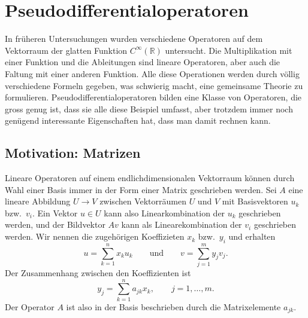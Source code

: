 %
%
%
\section{Pseudodifferentialoperatoren
\label{buch:opertoren:section:pseudodifferentialoperatoren}}
In früheren Untersuchungen wurden verschiedene Operatoren
auf dem Vektorraum der glatten Funktion $C^\infty(\mathbb{R})$ 
untersucht.
Die Multiplikation mit einer Funktion und die Ableitungen sind 
lineare Operatoren, aber auch die Faltung mit einer anderen Funktion.
Alle diese Operationen werden durch völlig verschiedene Formeln
gegeben, was schwierig macht, eine gemeinsame Theorie zu formulieren.
Pseudodifferentialoperatoren bilden eine Klasse von Operatoren, die
gross genug ist, dass sie alle diese Beispiel umfasst, aber trotzdem
immer noch genügend interessante Eigenschaften hat, dass man damit
rechnen kann.

%
%
\subsection{Motivation: Matrizen
\label{buch:operatoren:pseudodifferential:subsection:motivation}}
Lineare Operatoren auf einem endlichdimensionalen Vektorraum können
durch Wahl einer Basis immer in der Form einer Matrix geschrieben
werden.
Sei $A$ eine lineare Abbildung $U\to V$ zwischen Vektorräumen
$U$ und $V$ mit Basisvektoren $u_k$ bzw.~$v_i$.
Ein Vektor $u\in U$ kann also Linearkombination der $u_k$ geschrieben
werden, und der Bildvektor $Av$ kann als Linearekombination der $v_i$
geschrieben werden.
Wir nennen die zugehörigen Koeffizieten $x_k$ bzw.~$y_i$ und erhalten
\[
u = \sum_{k=1}^n x_ku_k
\qquad\text{und}\qquad
v = \sum_{j=1}^m y_jv_j.
\]
Der Zusammenhang zwischen den Koeffizienten ist
\[
y_j = \sum_{k=1}^n a_{jk}x_k,\qquad j=1,\dots,m.
\]
Der Operator $A$ ist also in der Basis beschrieben durch die Matrixelemente
$a_{jk}$.

